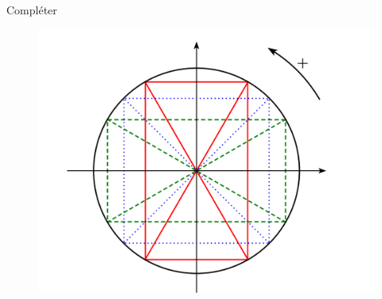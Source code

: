 \documentclass{article}
\begin{document}
\newpage
\begin{exercice}
	Compléter
	\begin{center}
	\begin{figure}[h!]
		\includegraphics[scale=0.8]{../cercle_trigo}
	\end{figure}
	\end{center}
\end{exercice}
	
\end{document}
